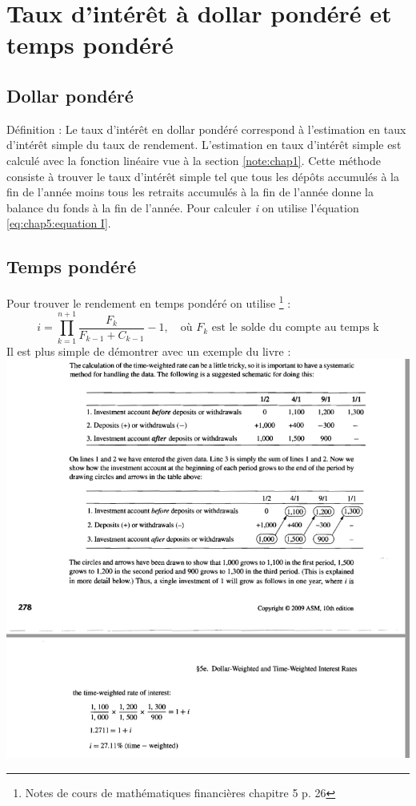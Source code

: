 \documentclass[11pt,french]{report}
\begin{document}
\section{Taux d'intérêt à dollar pondéré et temps pondéré}
\label{Dollar pondéré et temps pondéré}

\subsection{Dollar pondéré}

Définition : Le taux d'intérêt en dollar pondéré correspond à l'estimation en taux d'intérêt simple du taux de rendement. L'estimation en taux d'intérêt simple est calculé avec la fonction linéaire vue à la section \ref{note:chap1}. Cette méthode consiste à trouver le taux d'intérêt simple tel que tous les dépôts accumulés à la fin de l'année moins tous les retraits accumulés à la fin de l'année donne la balance du fonds à la fin de l'année. Pour calculer \textit{i} on utilise l'équation \ref{eq:chap5:equation I}.

\subsection{Temps pondéré}
Pour trouver le rendement en temps pondéré on utilise \footnote{Notes de cours de mathématiques financières chapitre 5 p. 26} :
\begin{equation}
i = \prod_{k=1}^{n+1} \frac{F_k}{F_{k-1} + C_{k-1}} - 1, \quad \text{où $F_k$ est le solde du compte au temps k}
\end{equation}
Il est plus simple de démontrer avec un exemple du livre :
\\
\includegraphics[scale=0.60]{picture13.PNG} 
\end{document}

